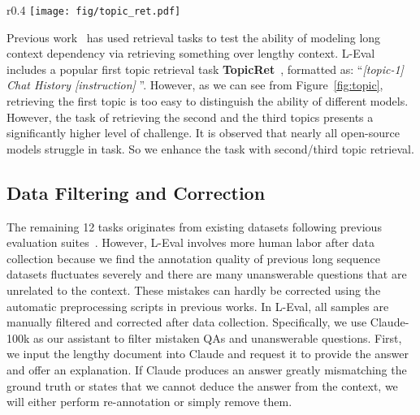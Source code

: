 \begin{wrapfigure}{r}{0.4\textwidth}
  \centering
  \vspace{-4mm}
  \texttt{[image: fig/topic\_ret.pdf]}
  \caption{Test Accuracy (\%) of different models with retrieving the first topic and retrieving the second/third topic.}
  \label{fig:topic}
  \vspace{-5mm}
\end{wrapfigure}
Previous work~\citep{longchat2023,liu2023lost} has used retrieval tasks to test the ability of modeling long context dependency via retrieving something over lengthy context. L-Eval includes a popular first topic retrieval task \textbf{TopicRet}~\citep{longchat2023}, formatted as: ``\textit{[topic-1] Chat History [instruction]} ''. However, as we can see from Figure~\ref{fig:topic}, retrieving the first topic is too easy to distinguish the ability of different models. However, the task of retrieving the second and the third topics presents a significantly higher level of challenge. It is observed that nearly all open-source models struggle in  task.  So we enhance the task with second/third topic retrieval.

\subsection{Data Filtering and Correction}\label{sec:postprocess}
The remaining 12 tasks originates from existing datasets following previous evaluation suites~\citep{zhang2023cab}.  However, L-Eval involves more human labor after data collection because we find the annotation quality of previous long sequence datasets fluctuates severely and there are many unanswerable questions that are unrelated to the context. These mistakes can hardly be corrected using the automatic preprocessing scripts in previous works. In L-Eval, all samples are manually filtered and corrected after data collection. Specifically, we use Claude-100k as our assistant to filter mistaken QAs and unanswerable questions. First, we input the lengthy document into Claude and request it to provide the answer and offer an explanation. If Claude produces an answer greatly mismatching the ground truth or states that we cannot deduce the answer from the context, we will either perform re-annotation or simply remove them. 

